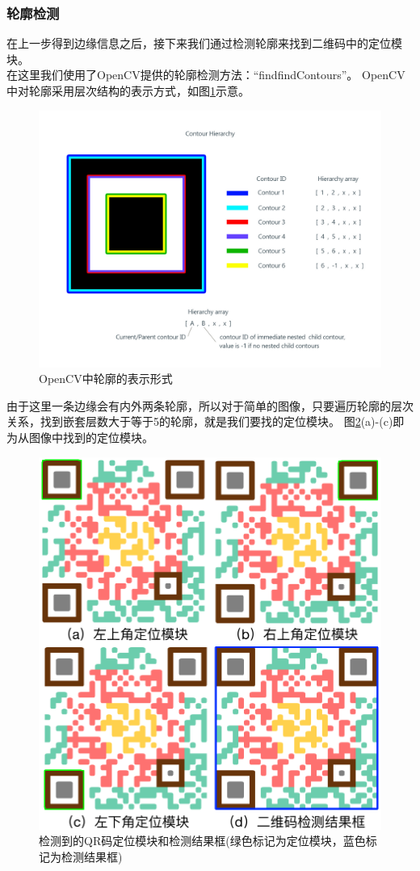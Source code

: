 \subsubsection{轮廓检测}
在上一步得到边缘信息之后，接下来我们通过检测轮廓来找到二维码中的定位模块。\\
在这里我们使用了OpenCV提供的轮廓检测方法：“findfindContours”。
OpenCV中对轮廓采用层次结构的表示方式，如图\ref{fig:contour}示意。
\begin{figure}[h]
\centering
\includegraphics[width=1\linewidth]{contour}
\caption[contour]{OpenCV中轮廓的表示形式}
\label{fig:contour}
\end{figure}

由于这里一条边缘会有内外两条轮廓，所以对于简单的图像，只要遍历轮廓的层次关系，找到嵌套层数大于等于5的轮廓，就是我们要找的定位模块。
图\ref{fig:detection}(a)-(c)即为从图像中找到的定位模块。
\begin{figure}[h]
\centering
\includegraphics[width=0.9\linewidth]{detection}
\caption[detection]{检测到的QR码定位模块和检测结果框(绿色标记为定位模块，蓝色标记为检测结果框)}
\label{fig:detection}
\end{figure}

